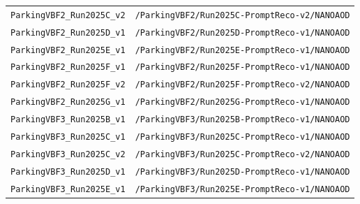 \begin{longtable}{@{}>{\RaggedRight\arraybackslash}p{} >{\RaggedRight\arraybackslash}p{}@{}}
\addlinespace[2pt]
\texttt{ParkingVBF2\_\allowbreak{}Run2025C\_\allowbreak{}v2} & \texttt{/\allowbreak{}ParkingVBF2/\allowbreak{}Run2025C-\allowbreak{}PromptReco-\allowbreak{}v2/\allowbreak{}NANOAOD} \\
\addlinespace[2pt]
\texttt{ParkingVBF2\_\allowbreak{}Run2025D\_\allowbreak{}v1} & \texttt{/\allowbreak{}ParkingVBF2/\allowbreak{}Run2025D-\allowbreak{}PromptReco-\allowbreak{}v1/\allowbreak{}NANOAOD} \\
\addlinespace[2pt]
\texttt{ParkingVBF2\_\allowbreak{}Run2025E\_\allowbreak{}v1} & \texttt{/\allowbreak{}ParkingVBF2/\allowbreak{}Run2025E-\allowbreak{}PromptReco-\allowbreak{}v1/\allowbreak{}NANOAOD} \\
\addlinespace[2pt]
\texttt{ParkingVBF2\_\allowbreak{}Run2025F\_\allowbreak{}v1} & \texttt{/\allowbreak{}ParkingVBF2/\allowbreak{}Run2025F-\allowbreak{}PromptReco-\allowbreak{}v1/\allowbreak{}NANOAOD} \\
\addlinespace[2pt]
\texttt{ParkingVBF2\_\allowbreak{}Run2025F\_\allowbreak{}v2} & \texttt{/\allowbreak{}ParkingVBF2/\allowbreak{}Run2025F-\allowbreak{}PromptReco-\allowbreak{}v2/\allowbreak{}NANOAOD} \\
\addlinespace[2pt]
\texttt{ParkingVBF2\_\allowbreak{}Run2025G\_\allowbreak{}v1} & \texttt{/\allowbreak{}ParkingVBF2/\allowbreak{}Run2025G-\allowbreak{}PromptReco-\allowbreak{}v1/\allowbreak{}NANOAOD} \\
\addlinespace[2pt]
\texttt{ParkingVBF3\_\allowbreak{}Run2025B\_\allowbreak{}v1} & \texttt{/\allowbreak{}ParkingVBF3/\allowbreak{}Run2025B-\allowbreak{}PromptReco-\allowbreak{}v1/\allowbreak{}NANOAOD} \\
\addlinespace[2pt]
\texttt{ParkingVBF3\_\allowbreak{}Run2025C\_\allowbreak{}v1} & \texttt{/\allowbreak{}ParkingVBF3/\allowbreak{}Run2025C-\allowbreak{}PromptReco-\allowbreak{}v1/\allowbreak{}NANOAOD} \\
\addlinespace[2pt]
\texttt{ParkingVBF3\_\allowbreak{}Run2025C\_\allowbreak{}v2} & \texttt{/\allowbreak{}ParkingVBF3/\allowbreak{}Run2025C-\allowbreak{}PromptReco-\allowbreak{}v2/\allowbreak{}NANOAOD} \\
\addlinespace[2pt]
\texttt{ParkingVBF3\_\allowbreak{}Run2025D\_\allowbreak{}v1} & \texttt{/\allowbreak{}ParkingVBF3/\allowbreak{}Run2025D-\allowbreak{}PromptReco-\allowbreak{}v1/\allowbreak{}NANOAOD} \\
\addlinespace[2pt]
\texttt{ParkingVBF3\_\allowbreak{}Run2025E\_\allowbreak{}v1} & \texttt{/\allowbreak{}ParkingVBF3/\allowbreak{}Run2025E-\allowbreak{}PromptReco-\allowbreak{}v1/\allowbreak{}NANOAOD} \\

\end{longtable}
